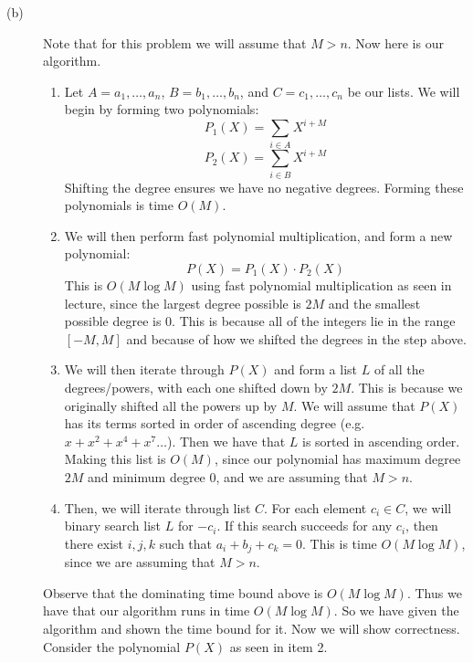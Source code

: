 \documentclass{article}
\begin{document}
\begin{description}
    \item[(b)]
        Note that for this problem we will assume that $M > n$. Now here is our
        algorithm.
        \begin{enumerate}
            \item Let $A = a_1, \dots, a_n$,
                $B = b_1, \dots, b_n$, and $C = c_1, \dots, c_n$ be our lists.
                We will begin by forming two polynomials:
                \[ P_1(X) = \sum_{i \in A} X^{i+M} \]
                \[ P_2(X) = \sum_{i \in B} X^{i+M} \]
                Shifting the degree ensures we have no negative degrees. Forming
                these polynomials is time $O(M)$.
            \item We will then perform fast polynomial multiplication, and form a new
                polynomial:
                \[ P(X) = P_1(X) \cdot P_2(X) \]
                This is $O(M \log M)$ using fast polynomial multiplication as
                seen in lecture, since the largest degree possible is $2M$
                and the smallest possible degree is $0$. This is because
                all of the integers lie in the range $[-M, M]$ and because of
                how we shifted the degrees in the step above.
            \item We will then iterate through $P(X)$ and form a list $L$ of all
                the degrees/powers, with each one shifted down by $2M$. This
                is because we originally shifted all the powers up by $M$.
                We will assume that $P(X)$ has its terms
                sorted in order of ascending degree (e.g. $x + x^2 + x^4 + x^7
                \dots$). Then we have that $L$ is sorted in ascending order.
                Making this list is $O(M)$, since our polynomial has maximum
                degree $2M$ and minimum degree $0$, and we are assuming that
                $M > n$.
            \item Then, we will iterate through list $C$. For each element $c_i
                \in C$, we will binary search list $L$ for $-c_i$. If this
                search succeeds for any $c_i$, then there exist $i,j,k$ such that
                $a_i + b_j + c_k = 0$. This is time $O(M \log M)$, since we are
                assuming that $M>n$.
        \end{enumerate}
        Observe that the dominating time bound above is $O(M \log M)$. Thus we have
        that our algorithm runs in time $O(M \log M)$.
        So we have given the algorithm and shown the time bound for it. Now we
        will show correctness. Consider the polynomial $P(X)$ as seen in item 2.

\end{description}
\end{document}
